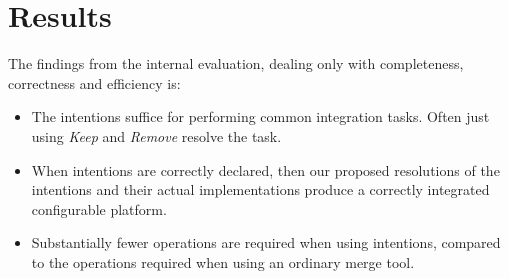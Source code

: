 \chapter{Results}
The findings from the internal evaluation, dealing only with completeness, correctness and efficiency is:

\begin{itemize}
    \item The intentions suffice for performing common integration tasks. Often just using \textit{Keep} and \textit{Remove} resolve the task.
    \item When intentions are correctly declared, then our proposed resolutions of the intentions and their actual implementations produce a correctly integrated configurable platform.
    \item Substantially fewer operations are required when using intentions, compared to the operations required when using an ordinary merge tool.
\end{itemize}

\section{\RQA}

\section{\RQB}

\section{\RQC}

